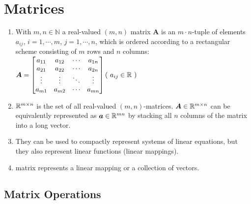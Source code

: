 \chapter{Matrices}

\begin{enumerate}
    \item With $m, n \in \mathbb{N}$ a real-valued $(m, n)$ matrix $\bm{A}$ is an $m\cdot n$-tuple of elements $a_{ij}$, $i = 1, \cdots , m$, $j = 1, \cdots , n$, which is ordered according to a rectangular scheme consisting of $m$ rows and $n$ columns:
    \\[0.2cm]
    $
        \bm{A}
        =
        \begin{bmatrix}
            a_{11} & a_{12} & \cdots & a_{1n} \\
            a_{21} & a_{22} & \cdots & a_{2n} \\
            \vdots & \vdots & \ddots & \vdots \\
            a_{m1} & a_{m2} & \cdots & a_{mn} \\
        \end{bmatrix}
        \hfill
        (\ a_{ij} \in \mbbR \ )
    $
    \hfill \cite{mfml/book/mml/Deisenroth-Faisal-Ong}

    \item $\mathbb{R}^{m\times n}$ is the set of all real-valued $(m, n)$-matrices. $\bm{A} \in \mathbb{R}^{m\times n}$ can be equivalently represented as $\bm{a} \in \mathbb{R}^{mn}$ by stacking all $n$ columns of the matrix into a long vector.
    \hfill \cite{mfml/book/mml/Deisenroth-Faisal-Ong}

    \vspace{0.5cm}

    \item They can be used to compactly represent systems of linear equations, but they also represent linear functions (linear mappings).
    \hfill \cite{mfml/book/mml/Deisenroth-Faisal-Ong}

    \item matrix represents a linear mapping or a collection of vectors.
    \hfill \cite{mfml/book/mml/Deisenroth-Faisal-Ong}
\end{enumerate}


\section{Matrix Operations}










